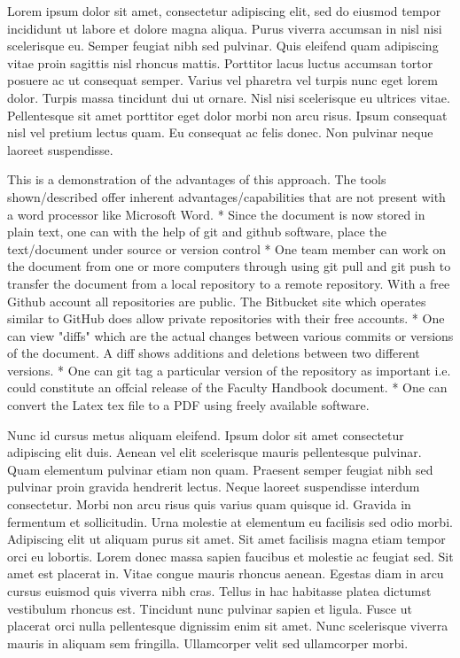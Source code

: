 Lorem ipsum dolor sit amet, consectetur adipiscing elit, sed do eiusmod tempor incididunt ut labore et dolore magna aliqua. Purus viverra accumsan in nisl nisi scelerisque eu. Semper feugiat nibh sed pulvinar. Quis eleifend quam adipiscing vitae proin sagittis nisl rhoncus mattis. Porttitor lacus luctus accumsan tortor posuere ac ut consequat semper. Varius vel pharetra vel turpis nunc eget lorem dolor. Turpis massa tincidunt dui ut ornare. Nisl nisi scelerisque eu ultrices vitae. Pellentesque sit amet porttitor eget dolor morbi non arcu risus. Ipsum consequat nisl vel pretium lectus quam. Eu consequat ac felis donec. Non pulvinar neque laoreet suspendisse.

This is a demonstration of the advantages of this approach. The tools shown/described offer inherent advantages/capabilities that are not present with a word processor like Microsoft Word.
* Since the document is now stored in plain text, one can with the help of git and github software, place the text/document under source or version control
* One team member can work on the document from one or more computers through using git pull and git push to transfer the document from a local repository to a remote repository. With a free Github account all repositories are public. The Bitbucket site which operates similar to GitHub does allow private repositories with their free accounts.
* One can view "diffs" which are the actual changes between various commits or versions of the document. A diff shows additions and deletions between two different versions.
* One can git tag a particular version of the repository as important i.e. could constitute an offcial release of the Faculty Handbook document.
* One can convert the Latex tex file to a PDF using freely available software.

Nunc id cursus metus aliquam eleifend. Ipsum dolor sit amet consectetur adipiscing elit duis. Aenean vel elit scelerisque mauris pellentesque pulvinar. Quam elementum pulvinar etiam non quam. Praesent semper feugiat nibh sed pulvinar proin gravida hendrerit lectus. Neque laoreet suspendisse interdum consectetur. Morbi non arcu risus quis varius quam quisque id. Gravida in fermentum et sollicitudin. Urna molestie at elementum eu facilisis sed odio morbi. Adipiscing elit ut aliquam purus sit amet. Sit amet facilisis magna etiam tempor orci eu lobortis. Lorem donec massa sapien faucibus et molestie ac feugiat sed. Sit amet est placerat in. Vitae congue mauris rhoncus aenean. Egestas diam in arcu cursus euismod quis viverra nibh cras. Tellus in hac habitasse platea dictumst vestibulum rhoncus est. Tincidunt nunc pulvinar sapien et ligula. Fusce ut placerat orci nulla pellentesque dignissim enim sit amet. Nunc scelerisque viverra mauris in aliquam sem fringilla. Ullamcorper velit sed ullamcorper morbi.

